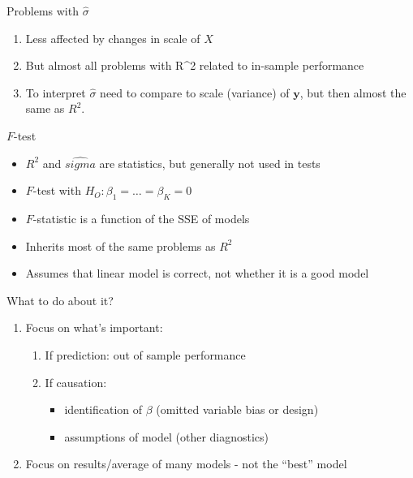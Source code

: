 \documentclass[ignorenonframetext,]{beamer}
\providecommand{\tightlist}{%
  \setlength{\itemsep}{0pt}\setlength{\parskip}{0pt}}
\renewcommand{\vec}[1]{\boldsymbol{#1}}
\begin{document}
\begin{frame}{Problems with \(\hat{\sigma}\)}

\begin{enumerate}[<+->]
\def\labelenumi{\arabic{enumi}.}
\tightlist
\item
  Less affected by changes in scale of \(X\)
\item
  But almost all problems with R\^{}2 related to in-sample performance
\item
  To interpret \(\hat{\sigma}\) need to compare to scale (variance) of
  \(\vec{y}\), but then almost the same as \(R^2\).
\end{enumerate}

\end{frame}

\begin{frame}{\(F\)-test}

\begin{itemize}[<+->]
\tightlist
\item
  \(R^2\) and \(\hat{sigma}\) are statistics, but generally not used in
  tests
\item
  \(F\)-test with \(H_O: \beta_1 = \dots = \beta_K = 0\)
\item
  \(F\)-statistic is a function of the SSE of models
\item
  Inherits most of the same problems as \(R^2\)
\item
  Assumes that linear model is correct, not whether it is a good model
\end{itemize}

\end{frame}

\begin{frame}{What to do about it?}

\begin{enumerate}[<+->]
\def\labelenumi{\arabic{enumi}.}
\tightlist
\item
  Focus on what's important:

  \begin{enumerate}[<+->]
  \def\labelenumii{\arabic{enumii}.}
  \item
    If prediction: out of sample performance
  \item
    If causation:

    \begin{itemize}[<+->]
    \tightlist
    \item
      identification of \(\beta\) (omitted variable bias or design)
    \item
      assumptions of model (other diagnostics)
    \end{itemize}
  \end{enumerate}
\item
  Focus on results/average of many models - not the ``best'' model
\end{enumerate}

\end{frame}
\end{document}

